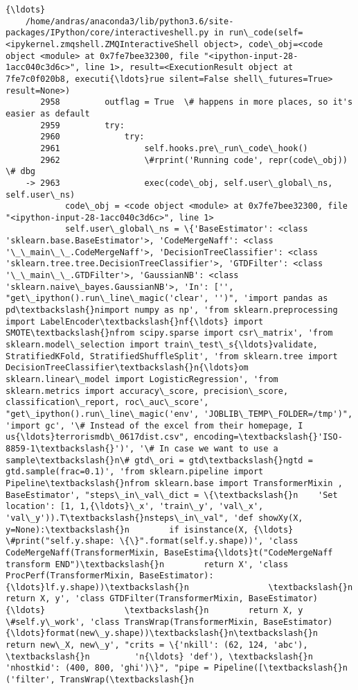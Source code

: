 \documentclass[11pt]{article}
\begin{document}
\begin{Verbatim}[commandchars=\\\{\}]
    {\ldots}
    /home/andras/anaconda3/lib/python3.6/site-packages/IPython/core/interactiveshell.py in run\_code(self=<ipykernel.zmqshell.ZMQInteractiveShell object>, code\_obj=<code object <module> at 0x7fe7bee32300, file "<ipython-input-28-1acc040c3d6c>", line 1>, result=<ExecutionResult object at 7fe7c0f020b8, executi{\ldots}rue silent=False shell\_futures=True> result=None>)
       2958         outflag = True  \# happens in more places, so it's easier as default
       2959         try:
       2960             try:
       2961                 self.hooks.pre\_run\_code\_hook()
       2962                 \#rprint('Running code', repr(code\_obj)) \# dbg
    -> 2963                 exec(code\_obj, self.user\_global\_ns, self.user\_ns)
            code\_obj = <code object <module> at 0x7fe7bee32300, file "<ipython-input-28-1acc040c3d6c>", line 1>
            self.user\_global\_ns = \{'BaseEstimator': <class 'sklearn.base.BaseEstimator'>, 'CodeMergeNaff': <class '\_\_main\_\_.CodeMergeNaff'>, 'DecisionTreeClassifier': <class 'sklearn.tree.tree.DecisionTreeClassifier'>, 'GTDFilter': <class '\_\_main\_\_.GTDFilter'>, 'GaussianNB': <class 'sklearn.naive\_bayes.GaussianNB'>, 'In': ['', "get\_ipython().run\_line\_magic('clear', '')", 'import pandas as pd\textbackslash{}nimport numpy as np', 'from sklearn.preprocessing import LabelEncoder\textbackslash{}nf{\ldots} import SMOTE\textbackslash{}nfrom scipy.sparse import csr\_matrix', 'from sklearn.model\_selection import train\_test\_s{\ldots}validate, StratifiedKFold, StratifiedShuffleSplit', 'from sklearn.tree import DecisionTreeClassifier\textbackslash{}n{\ldots}om sklearn.linear\_model import LogisticRegression', 'from sklearn.metrics import accuracy\_score, precision\_score, classification\_report, roc\_auc\_score', "get\_ipython().run\_line\_magic('env', 'JOBLIB\_TEMP\_FOLDER=/tmp')", 'import gc', '\# Instead of the excel from their homepage, I us{\ldots}terrorismdb\_0617dist.csv", encoding=\textbackslash{}'ISO-8859-1\textbackslash{}')', '\# In case we want to use a sample\textbackslash{}n\# gtd\_ori = gtd\textbackslash{}ngtd = gtd.sample(frac=0.1)', 'from sklearn.pipeline import Pipeline\textbackslash{}nfrom sklearn.base import TransformerMixin , BaseEstimator', "steps\_in\_val\_dict = \{\textbackslash{}n    'Set location': [1, 1,{\ldots}\_x', 'train\_y', 'val\_x', 'val\_y')).T\textbackslash{}nsteps\_in\_val", 'def showXy(X, y=None):\textbackslash{}n        if isinstance(X, {\ldots}  \#print("self.y.shape: \{\}".format(self.y.shape))', 'class CodeMergeNaff(TransformerMixin, BaseEstima{\ldots}t("CodeMergeNaff transform END")\textbackslash{}n        return X', 'class ProcPerf(TransformerMixin, BaseEstimator):{\ldots}lf.y.shape))\textbackslash{}n                \textbackslash{}n        return X, y', 'class GTDFilter(TransformerMixin, BaseEstimator){\ldots}                \textbackslash{}n        return X, y \#self.y\_work', 'class TransWrap(TransformerMixin, BaseEstimator){\ldots}format(new\_y.shape))\textbackslash{}n\textbackslash{}n        return new\_X, new\_y', "crits = \{'nkill': (62, 124, 'abc'), \textbackslash{}n         'n{\ldots} 'def'), \textbackslash{}n         'nhostkid': (400, 800, 'ghi')\}", "pipe = Pipeline([\textbackslash{}n    ('filter', TransWrap(\textbackslash{}n    
\end{Verbatim}
\end{document}
